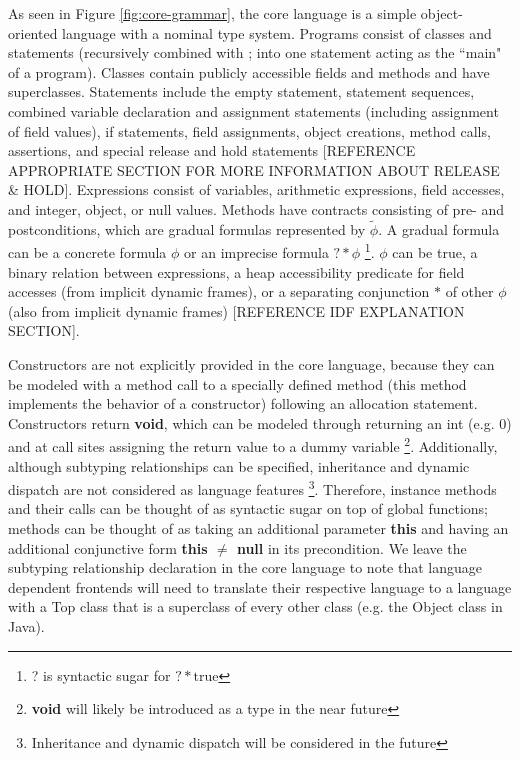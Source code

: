 \documentclass {article}
\newcommand{\true}{\text{true}}
\newcommand{\tphi}{\widetilde{\phi}}
\begin{document}
As seen in Figure \ref{fig:core-grammar}, the core language is a simple object-oriented language with a nominal type system. Programs consist of classes and statements (recursively
combined with ; into one statement acting as the ``main" of a program). Classes contain publicly accessible fields and methods and have superclasses. Statements include the empty statement, statement sequences, combined variable declaration and assignment statements (including assignment of field values), if statements, field assignments, object creations, method calls, assertions, and special release and hold statements [REFERENCE APPROPRIATE SECTION FOR MORE INFORMATION ABOUT RELEASE \& HOLD]. Expressions consist of variables, arithmetic expressions, field accesses, and integer, object, or null values. Methods have contracts consisting of pre- and postconditions, which are gradual formulas represented by $\tphi$. A gradual formula can be a concrete formula $\phi$ or an imprecise formula $? \ast \phi$ \footnote{? is syntactic sugar for $? \ast \true$}. $\phi$ can be true, a binary relation between expressions, a heap accessibility predicate for field accesses (from implicit dynamic frames), or a separating conjunction $\ast$ of other $\phi$ (also from implicit dynamic frames) [REFERENCE IDF EXPLANATION SECTION].

Constructors are not explicitly provided in the core language, because they can be modeled with a method call to a specially defined method (this method implements the behavior of a constructor) following an allocation statement. Constructors return \textbf{void}, which can be modeled through returning an int (e.g. 0) and at call sites assigning the return value to a dummy variable \footnote{\textbf{void} will likely be introduced as a type in the near future}. Additionally, although subtyping relationships can be specified, inheritance and dynamic dispatch are not considered as language features \footnote{Inheritance and dynamic dispatch will be considered in the future}. Therefore, instance methods and their calls can be thought of as syntactic sugar on top of global functions; methods can be thought of as taking an additional parameter \textbf{this} and having an additional conjunctive form \textbf{this $\neq$ null} in its precondition. We leave the subtyping relationship declaration in the core language to note that language dependent frontends will need to translate their respective language to a language with a Top class that is a superclass of every other class (e.g. the Object class in Java).
\end{document}
